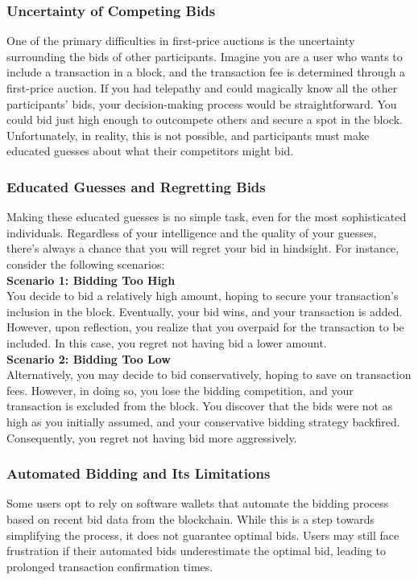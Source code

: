 \subsubsection{Uncertainty of Competing Bids}
One of the primary difficulties in first-price auctions is the uncertainty surrounding the bids of other participants. Imagine you are a user who wants to include a transaction in a block, and the transaction fee is determined through a first-price auction. If you had telepathy and could magically know all the other participants' bids, your decision-making process would be straightforward. You could bid just high enough to outcompete others and secure a spot in the block. Unfortunately, in reality, this is not possible, and participants must make educated guesses about what their competitors might bid.

\subsubsection{Educated Guesses and Regretting Bids}
Making these educated guesses is no simple task, even for the most sophisticated individuals. Regardless of your intelligence and the quality of your guesses, there's always a chance that you will regret your bid in hindsight. For instance, consider the following scenarios:\\

\noindent
\textbf{Scenario 1: Bidding Too High}\\
You decide to bid a relatively high amount, hoping to secure your transaction's inclusion in the block. Eventually, your bid wins, and your transaction is added. However, upon reflection, you realize that you overpaid for the transaction to be included. In this case, you regret not having bid a lower amount.\\


\noindent
\textbf{Scenario 2: Bidding Too Low}\\
Alternatively, you may decide to bid conservatively, hoping to save on transaction fees. However, in doing so, you lose the bidding competition, and your transaction is excluded from the block. You discover that the bids were not as high as you initially assumed, and your conservative bidding strategy backfired. Consequently, you regret not having bid more aggressively.

\subsubsection{Automated Bidding and Its Limitations}
Some users opt to rely on software wallets that automate the bidding process based on recent bid data from the blockchain. While this is a step towards simplifying the process, it does not guarantee optimal bids. Users may still face frustration if their automated bids underestimate the optimal bid, leading to prolonged transaction confirmation times.

